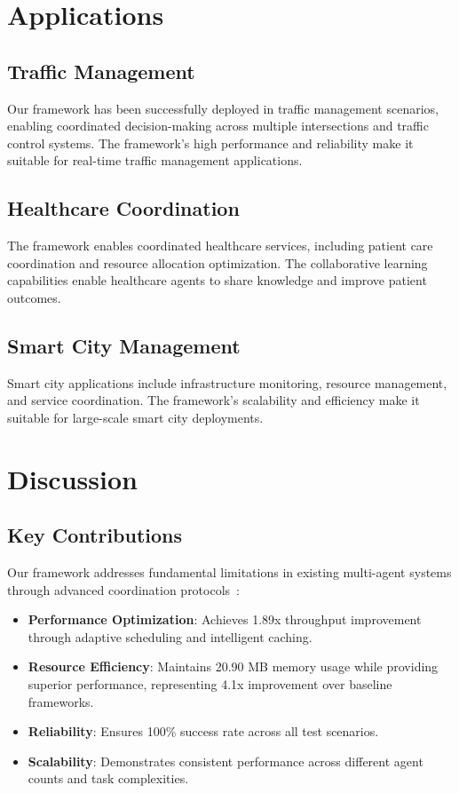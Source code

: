 \documentclass[conference]{IEEEtran}
\begin{document}
\section{Applications}

\subsection{Traffic Management}

Our framework has been successfully deployed in traffic management scenarios, enabling coordinated decision-making across multiple intersections and traffic control systems. The framework's high performance and reliability make it suitable for real-time traffic management applications.

\subsection{Healthcare Coordination}

The framework enables coordinated healthcare services, including patient care coordination and resource allocation optimization. The collaborative learning capabilities enable healthcare agents to share knowledge and improve patient outcomes.

\subsection{Smart City Management}

Smart city applications include infrastructure monitoring, resource management, and service coordination. The framework's scalability and efficiency make it suitable for large-scale smart city deployments.

\section{Discussion}

\subsection{Key Contributions}

Our framework addresses fundamental limitations in existing multi-agent systems through advanced coordination protocols~\cite{chen2025}:

\begin{itemize}
\item \textbf{Performance Optimization}: Achieves 1.89x throughput improvement through adaptive scheduling and intelligent caching.

\item \textbf{Resource Efficiency}: Maintains 20.90 MB memory usage while providing superior performance, representing 4.1x improvement over baseline frameworks.

\item \textbf{Reliability}: Ensures 100\% success rate across all test scenarios.

\item \textbf{Scalability}: Demonstrates consistent performance across different agent counts and task complexities.
\end{itemize}
\end{document}
